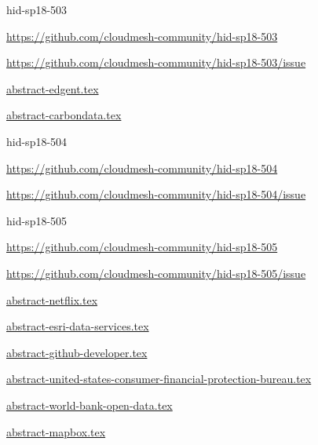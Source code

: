 \begin{IU}

hid-sp18-503

\url{https://github.com/cloudmesh-community/hid-sp18-503}

\url{https://github.com/cloudmesh-community/hid-sp18-503/issue}

\href{https://github.com/cloudmesh-community/hid-sp18-503/blob/master//technology/abstract-edgent.tex}{abstract-edgent.tex}

\href{https://github.com/cloudmesh-community/hid-sp18-503/blob/master//technology/abstract-carbondata.tex}{abstract-carbondata.tex}

\end{IU}


\begin{IU}

hid-sp18-504

\url{https://github.com/cloudmesh-community/hid-sp18-504}

\url{https://github.com/cloudmesh-community/hid-sp18-504/issue}

\end{IU}


\begin{IU}

hid-sp18-505

\url{https://github.com/cloudmesh-community/hid-sp18-505}

\url{https://github.com/cloudmesh-community/hid-sp18-505/issue}

\href{https://github.com/cloudmesh-community/hid-sp18-505/blob/master//technology/abstract-netflix.tex}{abstract-netflix.tex}

\href{https://github.com/cloudmesh-community/hid-sp18-505/blob/master//technology/abstract-esri-data-services.tex}{abstract-esri-data-services.tex}

\href{https://github.com/cloudmesh-community/hid-sp18-505/blob/master//technology/abstract-github-developer.tex}{abstract-github-developer.tex}

\href{https://github.com/cloudmesh-community/hid-sp18-505/blob/master//technology/abstract-united-states-consumer-financial-protection-bureau.tex}{abstract-united-states-consumer-financial-protection-bureau.tex}

\href{https://github.com/cloudmesh-community/hid-sp18-505/blob/master//technology/abstract-world-bank-open-data.tex}{abstract-world-bank-open-data.tex}

\href{https://github.com/cloudmesh-community/hid-sp18-505/blob/master//technology/abstract-mapbox.tex}{abstract-mapbox.tex}

\end{IU}


